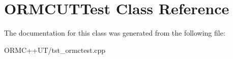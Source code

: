 \hypertarget{class_o_r_m_c_u_t_test}{
\section{\-O\-R\-M\-C\-U\-T\-Test \-Class \-Reference}
\label{class_o_r_m_c_u_t_test}
}


\-The documentation for this class was generated from the following file\-:\begin{DoxyCompactItemize}
\item 
\-O\-R\-M\-C++\-U\-T/tst\-\_\-ormctest.\-cpp\end{DoxyCompactItemize}
